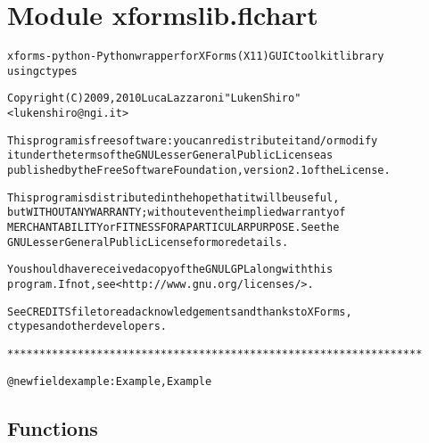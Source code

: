 %
%
%


\section{Module xformslib.flchart}

    \label{xformslib:flchart}
\begin{alltt}

xforms-python - Python wrapper for XForms (X11) GUI C toolkit library
using ctypes

Copyright (C) 2009, 2010  Luca Lazzaroni "LukenShiro"
    {\textless}lukenshiro@ngi.it{\textgreater}

This program is free software: you can redistribute it and/or modify
it under the terms of the GNU Lesser General Public License as
published by the Free Software Foundation, version 2.1 of the License.

This program is distributed in the hope that it will be useful,
but WITHOUT ANY WARRANTY; without even the implied warranty of
MERCHANTABILITY or FITNESS FOR A PARTICULAR PURPOSE. See the
GNU Lesser General Public License for more details.

You should have received a copy of the GNU LGPL along with this
program. If not, see {\textless}http://www.gnu.org/licenses/{\textgreater}.

See CREDITS file to read acknowledgements and thanks to XForms,
ctypes and other developers.

*****************************************************************


@newfield example: Example, Example
\end{alltt}



  \subsection{Functions}

